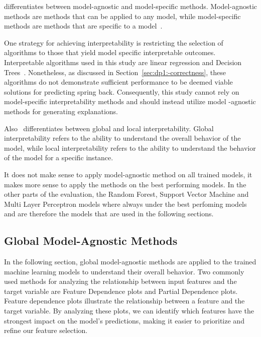 \cite{molnar2020interpretable} differentiates between model-agnostic and model-specific methods.
Model-agnostic methods are methods that can be applied to any model, while model-specific methods are
methods that are specific to a model~\cite[p. 19]{molnar2020interpretable}.

One strategy for achieving interpretability is restricting the selection of algorithms to those that yield
model specific interpretable outcomes.
Interpretable algorithms used in this study are linear regression and Decision
Trees~\cite[p. 35]{molnar2020interpretable}.
Nonetheless, as discussed in Section~\ref{sec:dp1:-correctness}, these algorithms do not demonstrate sufficient
performance to be deemed viable solutions for predicting spring back.
Consequently, this study cannot rely on model-specific interpretability methods and should instead utilize model
-agnostic methods for generating explanations.

Also~\cite{molnar2020interpretable} differentiates between global and local interpretability.
Global interpretability refers to the ability to understand the overall behavior of
the model, while local interpretability refers to the ability to understand the behavior of the
model for a specific instance.

It does not make sense to apply model-agnostic method on all trained models, it makes more sense to
apply the methods on the best performing models.
In the other parts of the evaluation, the Random Forest, Support Vector Machine and Multi Layer Perceptron models
where always under the best perfoming models and are therefore the models that are used in the following
sections.

\subsection{Global Model-Agnostic Methods}\label{subsec:global-model-agnostic-methods}
In the following section, global model-agnostic methods are applied to the trained machine learning models to
understand their overall behavior.
Two commonly used methods for analyzing the relationship between input features
and the target variable are Feature Dependence plots and Partial Dependence plots.
Feature dependence plots illustrate the relationship between a feature and the target variable.
By analyzing these plots, we can identify which features have the strongest impact on the model's
predictions, making it easier to prioritize and refine our feature selection.

